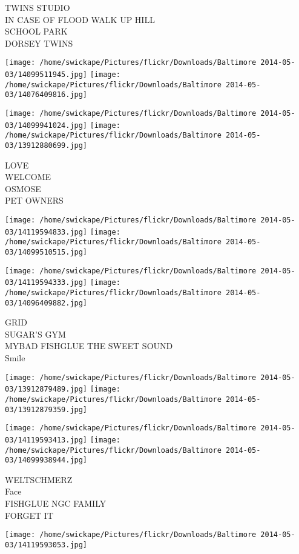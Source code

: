 \documentclass[10pt,letterpaper]{article}
\begin{document}
TWINS STUDIO\\
IN CASE OF FLOOD WALK UP HILL\\
SCHOOL PARK\\
DORSEY TWINS
\pagebreak

\texttt{[image: /home/swickape/Pictures/flickr/Downloads/Baltimore 2014-05-03/14099511945.jpg]}
\texttt{[image: /home/swickape/Pictures/flickr/Downloads/Baltimore 2014-05-03/14076409816.jpg]}

\texttt{[image: /home/swickape/Pictures/flickr/Downloads/Baltimore 2014-05-03/14099941024.jpg]}
\texttt{[image: /home/swickape/Pictures/flickr/Downloads/Baltimore 2014-05-03/13912880699.jpg]}

LOVE\\
WELCOME\\
OSMOSE\\
PET OWNERS
\pagebreak

\texttt{[image: /home/swickape/Pictures/flickr/Downloads/Baltimore 2014-05-03/14119594833.jpg]}
\texttt{[image: /home/swickape/Pictures/flickr/Downloads/Baltimore 2014-05-03/14099510515.jpg]}

\texttt{[image: /home/swickape/Pictures/flickr/Downloads/Baltimore 2014-05-03/14119594333.jpg]}
\texttt{[image: /home/swickape/Pictures/flickr/Downloads/Baltimore 2014-05-03/14096409882.jpg]}

GRID\\
SUGAR'S GYM\\
MYBAD FISHGLUE THE SWEET SOUND\\
Smile
\pagebreak

\texttt{[image: /home/swickape/Pictures/flickr/Downloads/Baltimore 2014-05-03/13912879489.jpg]}
\texttt{[image: /home/swickape/Pictures/flickr/Downloads/Baltimore 2014-05-03/13912879359.jpg]}

\texttt{[image: /home/swickape/Pictures/flickr/Downloads/Baltimore 2014-05-03/14119593413.jpg]}
\texttt{[image: /home/swickape/Pictures/flickr/Downloads/Baltimore 2014-05-03/14099938944.jpg]}

WELTSCHMERZ\\
Face\\
FISHGLUE NGC FAMILY\\
FORGET IT
\pagebreak

\texttt{[image: /home/swickape/Pictures/flickr/Downloads/Baltimore 2014-05-03/14119593053.jpg]}
\end{document}
